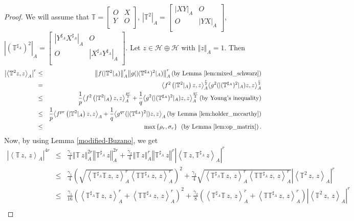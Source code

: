 \documentclass{article}
\newcommand{\bra}[1]{\left(#1\right)}
\newcommand{\seqA}[1]{{\left<#1\right>}_{A}}
\newcommand{\norm}[1]{\left\Vert#1\right\Vert}
\newcommand{\normA}[1]{{\left\Vert#1\right\Vert}_{A}}
\newcommand{\abs}[1]{\left\vert#1\right\vert}
\newcommand{\set}[1]{\left\{#1\right\}}
\newcommand{\hh}{\mathcal{H}\oplus\mathcal{H}}
\newcommand {\T}{\mathbb{T}}
\newcommand {\Ta}{\mathbb{T}^{\sharp_{A}}}
\newcommand {\Xa}{X^{\sharp_{A}}}
\newcommand {\Ya}{Y^{\sharp_{A}}}
\begin{document}
\begin{proof} We will assume that $\T=\begin{bmatrix} O& X\\ Y& O \\\end{bmatrix}$, $|\T^2|_{A}=\begin{bmatrix} |XY|_{A}& O\\ O& |YX|_{A} \\\end{bmatrix}$, $|(\Ta)^2|_{A}=\begin{bmatrix} |\Ya\Xa|_{A}& O\\ O& |\Xa\Ya|_{A}\\\end{bmatrix}$.
Let $z\in\hh$ with $\normA{z}=1$. Then
\begin{eqnarray}\label{Isra1}
  \abs{\seqA{\T^2z,z}}^{r} &\leq&\normA{f(|\T^2|_A)}^{r}\normA{g(|(\Ta)^2|_A)}^r\bra{\mbox{by Lemma \ref{lem:mixed_schwarz}}} \nonumber\\
  &=& \seqA{f^2\bra{|\T^2|_A}z,z}^{\frac{r}{2}}\seqA{g^2(|(\Ta)^2|_A)z,z}^{\frac{r}{2}}\nonumber\\
  &\leq& \frac{1}{p}\seqA{f^2\bra{|\T^2|_A}z,z}^{\frac{pr}{2}}+\frac{1}{q}\seqA{g^2(|(\Ta)^2|_A)z,z}^{\frac{qr}{2}}
  \bra{\mbox{by Young's inequality}}\nonumber\\
  &\leq&\frac{1}{p}\seqA{f^{pr}\bra{|\T^2|_A}z,z}+\frac{1}{q}\seqA{g^{qr}(|(\Ta)^2|)z,z}\bra{\mbox{by Lemma \ref{lem:holder_mccarthy}}}\\
  &\leq& \max\set{\rho_r,\sigma_r}\,\,\,\bra{\mbox{by Lemma \ref{lem:op_matrix}}}.\nonumber
\end{eqnarray}
Now, by using Lemma \ref{modified-Buzano}, we get
\begin{eqnarray*}
  \abs{\seqA{\T\,z,\,z}}^{4r} &\leq&\frac{\gamma_1}{4}\normA{\T\,z}^{2r}\normA{\Ta\,z}^{2r}+\frac{\gamma_2}{4}\normA{\T\,z}^{r}\norm{\Ta\,z}^{r}\abs{\seqA{\T\,z,\Ta\,z}}^r \\
   &\leq& \frac{\gamma_1}{4}\bra{\sqrt{\seqA{\Ta\T\,z,\,z}^{r}\seqA{\T\Ta\,z,\,z}^{r}}}^2+\frac{\gamma_2}{4}
   \sqrt{\seqA{\Ta\T\,z,\,z}^{r}\seqA{\T\Ta\,z,\,z}^{r}} \abs{\seqA{\T^2\,z,\,z}}^r\\
   &\leq& \frac{\gamma_1}{16}\bra{\seqA{\Ta\T\,z,\,z}^{r}+\seqA{\T\Ta\,z,\,z}^{r}}^2
   +\frac{\gamma_2}{8}\bra{\seqA{\Ta\T\,z,\,z}^{r}+\seqA{\T\Ta\,z,\,z}^{r}}
   \abs{\seqA{\T^2\,z,\,z}}^r\\

\end{eqnarray*}
\end{proof}
\end{document}
